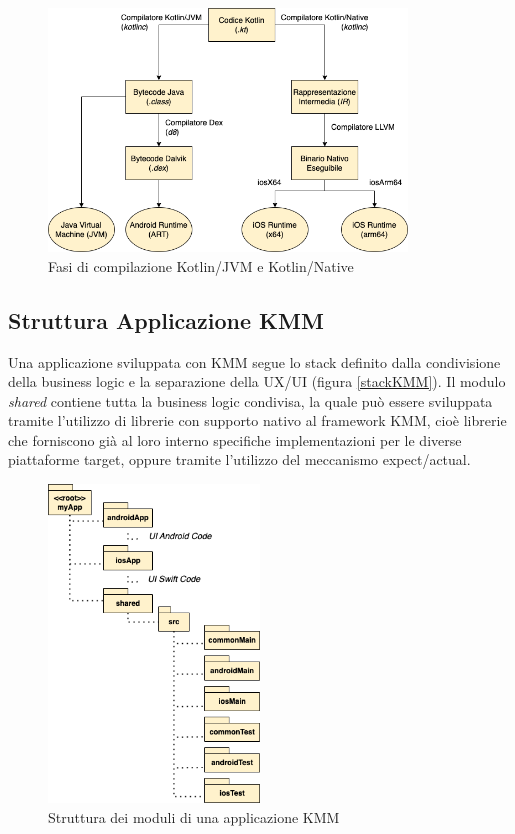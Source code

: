 \begin{figure}[H]
    \centering
    \includegraphics[width=0.85\textwidth]{img/compilatore_kotlin.png}
    \caption{Fasi di compilazione Kotlin/JVM e Kotlin/Native}
\end{figure}

\subsection{Struttura Applicazione KMM}
Una applicazione sviluppata con KMM segue lo stack definito dalla condivisione della business logic e la separazione della UX/UI (figura \ref{stackKMM}). Il modulo \textit{shared} contiene tutta la business logic condivisa, la quale può essere sviluppata tramite l'utilizzo di librerie con supporto nativo al framework KMM, cioè librerie che forniscono già al loro interno specifiche implementazioni per le diverse piattaforme target, oppure tramite l'utilizzo del meccanismo expect/actual.

\begin{figure}[H]
    \centering
    \includegraphics[width=0.5\textwidth]{img/struttura_app_kmm.png}
    \caption{Struttura dei moduli di una applicazione KMM}
\end{figure}

